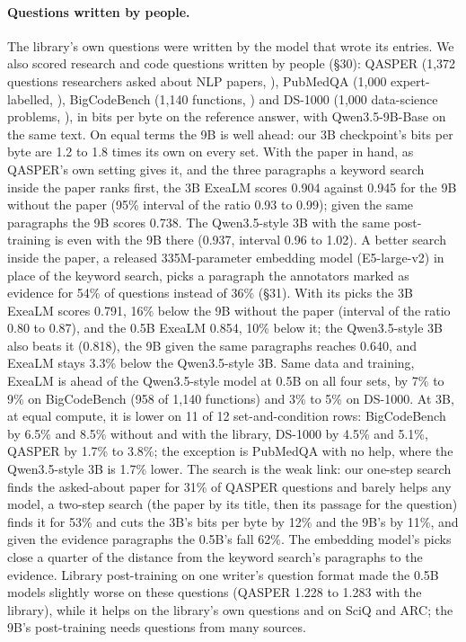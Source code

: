 \documentclass[10pt,twocolumn,letterpaper]{article}
\newcommand{\sect}[1]{\S#1}
\begin{document}
\paragraph{Questions written by people.}
The library's own questions were written by the model that wrote its entries.
We also scored research and code questions written by people (\sect{30}): QASPER (1,372 questions researchers asked about NLP papers, \citealp{dasigi2021qasper}), PubMedQA (1,000 expert-labelled, \citealp{jin2019pubmedqa}), BigCodeBench (1,140 functions, \citealp{zhuo2024bigcodebench}) and DS-1000 (1,000 data-science problems, \citealp{lai2023ds1000}), in bits per byte on the reference answer, with Qwen3.5-9B-Base on the same text.
On equal terms the 9B is well ahead: our 3B checkpoint's bits per byte are 1.2 to 1.8 times its own on every set.
With the paper in hand, as QASPER's own setting gives it, and the three paragraphs a keyword search inside the paper ranks first, the 3B ExeaLM scores 0.904 against 0.945 for the 9B without the paper (95\% interval of the ratio 0.93 to 0.99); given the same paragraphs the 9B scores 0.738.
The Qwen3.5-style 3B with the same post-training is even with the 9B there (0.937, interval 0.96 to 1.02).
A better search inside the paper, a released 335M-parameter embedding model (E5-large-v2) in place of the keyword search, picks a paragraph the annotators marked as evidence for 54\% of questions instead of 36\% (\sect{31}).
With its picks the 3B ExeaLM scores 0.791, 16\% below the 9B without the paper (interval of the ratio 0.80 to 0.87), and the 0.5B ExeaLM 0.854, 10\% below it; the Qwen3.5-style 3B also beats it (0.818), the 9B given the same paragraphs reaches 0.640, and ExeaLM stays 3.3\% below the Qwen3.5-style 3B.
Same data and training, ExeaLM is ahead of the Qwen3.5-style model at 0.5B on all four sets, by 7\% to 9\% on BigCodeBench (958 of 1,140 functions) and 3\% to 5\% on DS-1000.
At 3B, at equal compute, it is lower on 11 of 12 set-and-condition rows: BigCodeBench by 6.5\% and 8.5\% without and with the library, DS-1000 by 4.5\% and 5.1\%, QASPER by 1.7\% to 3.8\%; the exception is PubMedQA with no help, where the Qwen3.5-style 3B is 1.7\% lower.
The search is the weak link: our one-step search finds the asked-about paper for 31\% of QASPER questions and barely helps any model, a two-step search (the paper by its title, then its passage for the question) finds it for 53\% and cuts the 3B's bits per byte by 12\% and the 9B's by 11\%, and given the evidence paragraphs the 0.5B's fall 62\%. The embedding model's picks close a quarter of the distance from the keyword search's paragraphs to the evidence.
Library post-training on one writer's question format made the 0.5B models slightly worse on these questions (QASPER 1.228 to 1.283 with the library), while it helps on the library's own questions and on SciQ and ARC; the 9B's post-training needs questions from many sources.
\end{document}
